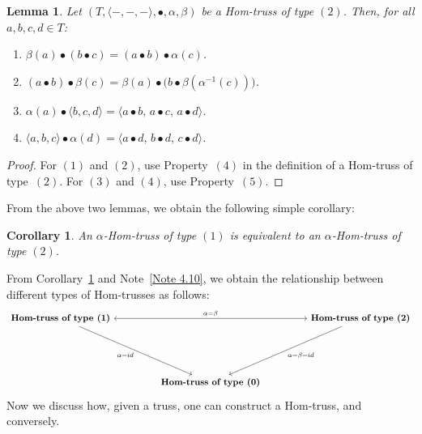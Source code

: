\documentclass[14pt]{article}
\newtheorem{lemma}[thm]{Lemma}
\theoremstyle{Definition}
\newtheorem{Coro}[thm]{Corollary}
\theoremstyle{remark}
\begin{document}
\begin{lemma}
Let $(T, \langle -,-,- \rangle, \bullet, \alpha, \beta)$ be a Hom-truss of type $(2)$. Then, for all $a, b, c, d \in T$:
\begin{enumerate}
\item $\beta(a) \bullet (b \bullet c) = (a \bullet b) \bullet \alpha(c)$.
\item $(a \bullet b) \bullet \beta(c) = \beta(a) \bullet \big( b \bullet \beta(\alpha^{-1}(c)) \big)$.
\item $\alpha(a) \bullet \langle b, c, d \rangle = \langle a \bullet b, \, a \bullet c, \, a \bullet d \rangle$.
\item $\langle a, b, c \rangle \bullet \alpha(d) = \langle a \bullet d, \, b \bullet d, \, c \bullet d \rangle$.
\end{enumerate}
\end{lemma}
\begin{proof}
For $(1)$ and $(2)$, use Property~$(4)$ in the definition of a Hom-truss of type~$(2)$. For $(3)$ and $(4)$, use Property~$(5)$.
\end{proof}


 From the above two lemmas, we obtain the following simple corollary:
\begin{Coro} \label{Coro 4.16}
An $\alpha$-Hom-truss of type $(1)$ is equivalent to an $\alpha$-Hom-truss of type $(2)$.
\end{Coro}

From Corollary~\ref{Coro 4.16} and Note~\ref{Note 4.10}, we obtain the relationship between different types of Hom-trusses as follows:  
\[
\begin{tikzcd}
	{\textbf{Hom-truss of type (1)}} 
	\arrow[<->, "{\alpha=\beta}"]{rrrr} 
	&&&& {\textbf{Hom-truss of type (2)}} \\
	\\
	\\
	&& {\textbf{Hom-truss of type (0)}}
	\arrow["{\alpha=id}"', from=1-1, to=4-3]
	\arrow["{\alpha=\beta=id}", from=1-5, to=4-3]
\end{tikzcd}
\]
 Now we discuss how, given a truss, one can construct a Hom-truss, and conversely.  
\end{document}
